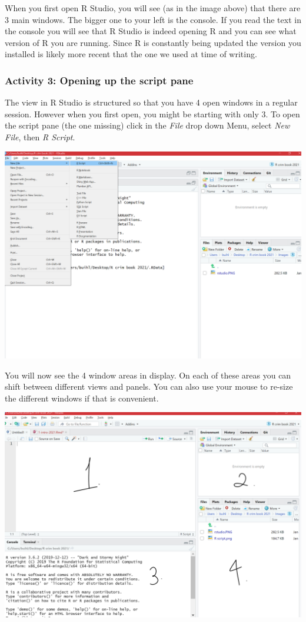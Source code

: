 \documentclass[
]{book}
\begin{document}
When you first open R Studio, you will see (as in the image above) that there are 3 main windows. The bigger one to your left is the console. If you read the text in the console you will see that R Studio is indeed opening R and you can see what version of R you are running. Since R is constantly being updated the version you installed is likely more recent that the one we used at time of writing.

\hypertarget{activity-3-opening-up-the-script-pane}{%
\subsubsection{Activity 3: Opening up the script pane}\label{activity-3-opening-up-the-script-pane}}

The view in R Studio is structured so that you have 4 open windows in a regular session. However when you first open, you might be starting with only 3. To open the script pane (the one missing) click in the \emph{File} drop down Menu, select \emph{New File}, then \emph{R Script}.

\includegraphics{img/openscript.png}

You will now see the 4 window areas in display. On each of these areas you can shift between different views and panels. You can also use your mouse to re-size the different windows if that is convenient.

\includegraphics{img/the4views.png}
\end{document}
